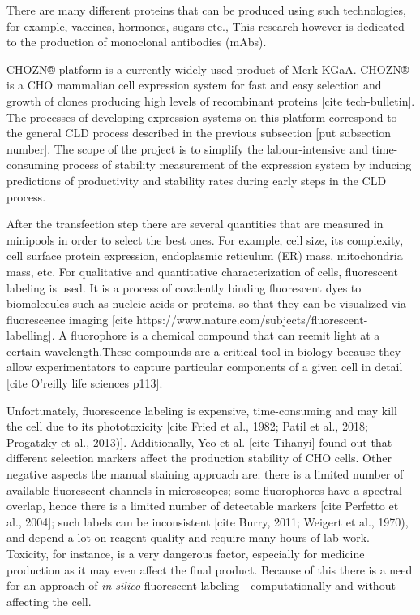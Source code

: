 There are many different proteins that can be produced using such technologies, for example, vaccines, hormones, sugars etc., This research however is dedicated to the production of monoclonal antibodies (mAbs). 

CHOZN® platform is a currently widely used product of Merk KGaA. CHOZN® is a CHO mammalian cell expression system for fast and easy selection and growth of clones producing high levels of recombinant proteins [cite tech-bulletin]. The processes of developing expression systems on this platform correspond to the general CLD process described in the previous subsection [put subsection number]. The scope of the project is to simplify the labour-intensive and time-consuming process of stability measurement of the expression system by inducing predictions of productivity and stability rates during early steps in the CLD process. 

After the transfection step there are several quantities that are measured in minipools in order to select the best ones. For example, cell size, its complexity, cell surface protein expression, endoplasmic reticulum (ER) mass, mitochondria mass, etc. For qualitative and quantitative characterization of cells, fluorescent labeling is used. It is a process of covalently binding fluorescent dyes to biomolecules such as nucleic acids or proteins, so that they can be visualized via fluorescence imaging [cite https://www.nature.com/subjects/fluorescent-labelling]. A fluorophore is a chemical compound that can reemit light at a certain wavelength.These compounds are a critical tool in biology because they allow experimentators to capture particular components of a given cell in detail [cite O'reilly life sciences p113].

Unfortunately, fluorescence labeling is expensive, time-consuming and may kill the cell due to its phototoxicity [cite Fried et al., 1982; Patil et al., 2018; Progatzky et al., 2013)]. Additionally, Yeo et al. [cite Tihanyi] found out that different selection markers affect the production stability of CHO cells. Other negative aspects  the manual staining approach are: there is a limited number of available fluorescent channels in microscopes; some fluorophores have a spectral overlap, hence there is a limited number of detectable markers [cite Perfetto et al., 2004]; such labels can be inconsistent [cite Burry, 2011; Weigert et al., 1970), and depend a lot on reagent quality and require many hours of lab work. Toxicity, for instance, is a very dangerous factor, especially for medicine production as it may even affect the final product. Because of this there is a need for an approach of \textit{in silico} fluorescent labeling - computationally and without affecting the cell. 

